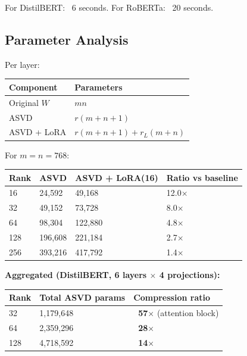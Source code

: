 For DistilBERT: ~6 seconds.
For RoBERTa: ~20 seconds.

\subsection{Parameter Analysis}

Per layer:

\begin{table}[H]
\centering
\small
\begin{tabular}{ll}
\toprule
\textbf{Component} & \textbf{Parameters} \\
\midrule
Original $W$ & $m n$ \\
ASVD & $r(m + n + 1)$ \\
ASVD + LoRA & $r(m + n + 1) + r_L(m + n)$ \\
\bottomrule
\end{tabular}
\end{table}

For $m = n = 768$:

\begin{table}[H]
\centering
\small
\begin{tabular}{llll}
\toprule
\textbf{Rank} & \textbf{ASVD} & \textbf{ASVD + LoRA(16)} & \textbf{Ratio vs baseline} \\
\midrule
16 & 24,592 & 49,168 & 12.0$\times$ \\
32 & 49,152 & 73,728 & 8.0$\times$ \\
64 & 98,304 & 122,880 & 4.8$\times$ \\
128 & 196,608 & 221,184 & 2.7$\times$ \\
256 & 393,216 & 417,792 & 1.4$\times$ \\
\bottomrule
\end{tabular}
\end{table}

\textbf{Aggregated (DistilBERT, 6 layers $\times$ 4 projections):}

\begin{table}[H]
\centering
\small
\begin{tabular}{lll}
\toprule
\textbf{Rank} & \textbf{Total ASVD params} & \textbf{Compression ratio} \\
\midrule
32 & 1,179,648 & \textbf{~57$\times$} (attention block) \\
64 & 2,359,296 & \textbf{~28$\times$} \\
128 & 4,718,592 & \textbf{~14$\times$} \\
\bottomrule
\end{tabular}
\end{table}

